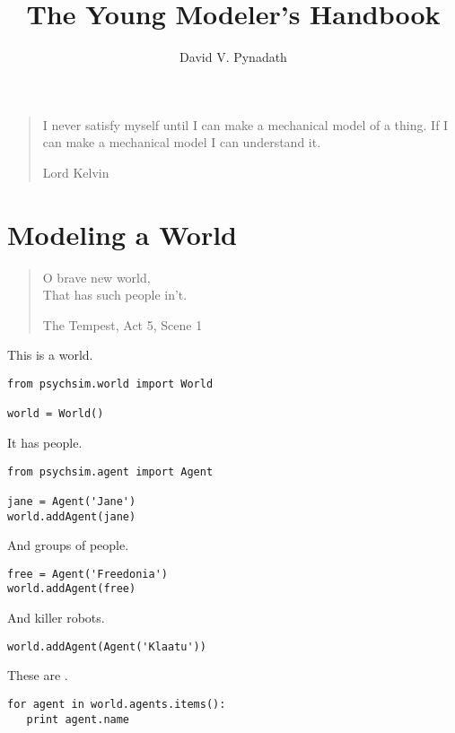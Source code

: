 \documentclass{book}
\title{The Young Modeler's Handbook}
\author{David V. Pynadath}
\begin{document}
\maketitle
\begin{quotation}
I never satisfy myself until I can make a mechanical model of a thing. If I can make a mechanical model I can understand it.

\hfill Lord Kelvin
\end{quotation}

\chapter{Modeling a World}
\begin{quotation}
\noindent O brave new world,\\
That has such people in't.

\hfill The Tempest, Act 5, Scene 1
\end{quotation}
\clearpage

This is a world.

\vfill 

\begin{verbatim}
from psychsim.world import World

world = World()
\end{verbatim}
\clearpage

It has people.

\vfill

\begin{verbatim}
from psychsim.agent import Agent

jane = Agent('Jane')
world.addAgent(jane)
\end{verbatim}
\clearpage

And groups of people.

\vfill
\begin{verbatim}
free = Agent('Freedonia')
world.addAgent(free)
\end{verbatim}
\clearpage

And killer robots.

\vfill

\begin{verbatim}
world.addAgent(Agent('Klaatu'))
\end{verbatim}
\clearpage
These are .

\vfill
\begin{verbatim}
for agent in world.agents.items():
   print agent.name
\end{verbatim}
\clearpage
\end{document}
